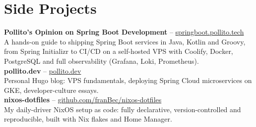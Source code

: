\documentclass[10pt, a4paper]{article}
\begin{document}
\section{Side Projects}
\textbf{Pollito's Opinion on Spring Boot Development} -- \href{https://springboot.pollito.tech/}{springboot.pollito.tech} \\
A hands-on guide to shipping Spring Boot services in Java, Kotlin and Groovy, from Spring Initializr to CI/CD on a self-hosted VPS with Coolify, Docker, PostgreSQL and full observability (Grafana, Loki, Prometheus). \\[2pt]
\textbf{pollito.dev} -- \href{https://pollito.dev/}{pollito.dev} \\
Personal Hugo blog: VPS fundamentals, deploying Spring Cloud microservices on GKE, developer-culture essays. \\[2pt]
\textbf{nixos-dotfiles} -- \href{https://github.com/franBec/nixos-dotfiles}{github.com/franBec/nixos-dotfiles} \\
My daily-driver NixOS setup as code: fully declarative, version-controlled and reproducible, built with Nix flakes and Home Manager.
\end{document}
